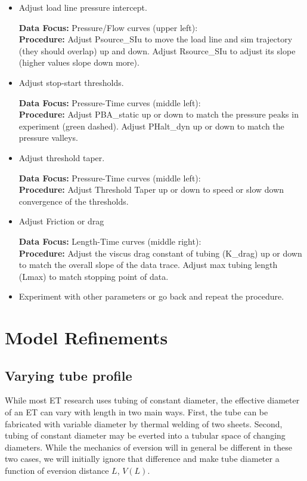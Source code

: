 \documentclass[letterpaper]{article}
\begin{document}
\begin{itemize}
    \item  Adjust load line pressure intercept.

    {\bf Data Focus: } Pressure/Flow curves (upper left):\\
    {\bf Procedure: } Adjust Psource\_SIu to move the load line and sim trajectory (they should overlap)
    up and down.  Adjust Rsource\_SIu to adjust its slope (higher values slope down more).

    \item Adjust stop-start thresholds.

     {\bf Data Focus: } Pressure-Time curves (middle left):\\
    {\bf Procedure: } Adjust PBA\_static up or down to match the pressure peaks in experiment (green dashed).
    Adjust PHalt\_dyn  up or down to match the pressure valleys.

    \item Adjust threshold taper.

     {\bf Data Focus: } Pressure-Time curves (middle left):\\
    {\bf Procedure: } Adjust Threshold Taper up or down to speed or slow down convergence of the thresholds.

    \item Adjust Friction or drag

     {\bf Data Focus: } Length-Time curves (middle right):\\
    {\bf Procedure: } Adjust the viscus drag constant of tubing (K\_drag) up or down to match the overall slope
    of the data trace.
    Adjust max tubing length (Lmax) to match stopping point of data.

    \item Experiment with other parameters or go back and repeat the procedure.

\end{itemize}


\section{Model Refinements}

\subsection{Varying tube profile}

While most ET research uses tubing of constant diameter, the effective diameter of an ET can vary with
length in two main ways.   First, the tube can be fabricated with variable diameter by thermal welding of two sheets.
Second, tubing of constant diameter may be everted into a tubular space of changing diameters.
While the mechanics of eversion will in general be different in these two cases, we will initially ignore that difference
and make tube diameter a function of eversion distance $L$, $V(L)$.
\end{document}

